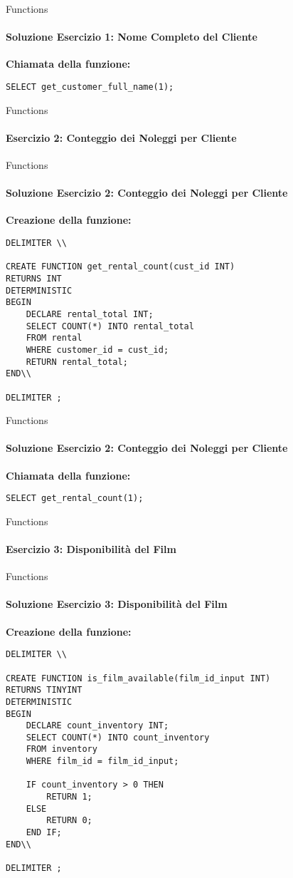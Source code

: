 %
\begin{frame}[fragile]{Functions}
\framesubtitle{Soluzione Esercizio 1: Nome Completo del Cliente}
\consegnaFunctionsExOne

\vspace{.2cm}

\textbf{Chiamata della funzione:}
\begin{lstlisting}
SELECT get_customer_full_name(1);
\end{lstlisting}
\end{frame}
%
\begin{frame}[fragile]{Functions}
\framesubtitle{Esercizio 2: Conteggio dei Noleggi per Cliente}
\consegnaFunctionsExTwo
\end{frame}
%
\begin{frame}[fragile]{Functions}
\framesubtitle{Soluzione Esercizio 2: Conteggio dei Noleggi per Cliente}

\vspace{-.5cm}
\small
\textbf{Creazione della funzione:}
\begin{lstlisting}
DELIMITER \\

CREATE FUNCTION get_rental_count(cust_id INT)
RETURNS INT
DETERMINISTIC
BEGIN
    DECLARE rental_total INT;
    SELECT COUNT(*) INTO rental_total
    FROM rental
    WHERE customer_id = cust_id;
    RETURN rental_total;
END\\

DELIMITER ;
\end{lstlisting}
\end{frame}
%
\begin{frame}[fragile]{Functions}
\framesubtitle{Soluzione Esercizio 2: Conteggio dei Noleggi per Cliente}
\consegnaFunctionsExTwo

\vspace{.2cm}

\textbf{Chiamata della funzione:}
\begin{lstlisting}
SELECT get_rental_count(1);
\end{lstlisting}
\end{frame}
%
\begin{frame}[fragile]{Functions}
\framesubtitle{Esercizio 3: Disponibilit\`a del Film}
\consegnaFunctionsExThree
\end{frame}
%
\begin{frame}[fragile]{Functions}
\framesubtitle{Soluzione Esercizio 3: Disponibilit\`a del Film}

\vspace{-.5cm}
\scriptsize
\textbf{Creazione della funzione:}
\begin{lstlisting}
DELIMITER \\

CREATE FUNCTION is_film_available(film_id_input INT)
RETURNS TINYINT
DETERMINISTIC
BEGIN
    DECLARE count_inventory INT;
    SELECT COUNT(*) INTO count_inventory
    FROM inventory
    WHERE film_id = film_id_input;

    IF count_inventory > 0 THEN
        RETURN 1;
    ELSE
        RETURN 0;
    END IF;
END\\

DELIMITER ;
\end{lstlisting}
\end{frame}
